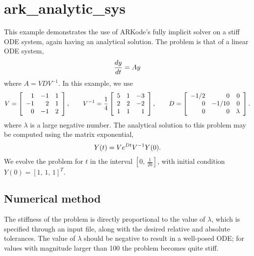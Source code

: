 \documentclass[letterpaper,10pt,english]{sphinxmanual}
\begin{document}
\chapter{ark\_analytic\_sys}
\label{ark_analytic_sys:ark-analytic-sys}\label{ark_analytic_sys::doc}\label{ark_analytic_sys:id1}
This example demonstrates the use of ARKode's fully implicit solver on
a stiff ODE system, again having an analytical solution.  The problem
is that of a linear ODE system,
\begin{gather}
\begin{split}\frac{dy}{dt} = Ay\end{split}\notag
\end{gather}
where $A = V D V^{-1}$.  In this example, we use
\begin{gather}
\begin{split}V = \left[\begin{array}{rrr} 1 & -1 & 1\\ -1 & 2 & 1\\ 0 & -1 & 2
    \end{array}\right], \qquad
V^{-1} = \frac14 \left[\begin{array}{rrr} 5 & 1 & -3\\ 2 & 2 & -2\\
    1 & 1 & 1 \end{array}\right], \qquad
D = \left[\begin{array}{rrr} -1/2 & 0 & 0\\ 0 & -1/10 & 0\\ 0 & 0 &
    \lambda \end{array}\right].\end{split}\notag
\end{gather}
where $\lambda$ is a large negative number. The analytical
solution to this problem may be computed using the matrix exponential,
\begin{gather}
\begin{split}Y(t) = V e^{Dt} V^{-1} Y(0).\end{split}\notag
\end{gather}
We evolve the problem for $t$ in the interval $\left[0,\,
\frac{1}{20}\right]$, with initial condition $Y(0) = \left[1,\,
1,\, 1\right]^T$.


\section{Numerical method}
\label{ark_analytic_sys:numerical-method}
The stiffness of the problem is directly proportional to the
value of $\lambda$, which is specified through an input file,
along with the desired relative and absolute tolerances.  The value of
$\lambda$ should be negative to result in a well-posed ODE; for
values with magnitude larger than 100 the problem becomes quite stiff.
\end{document}
